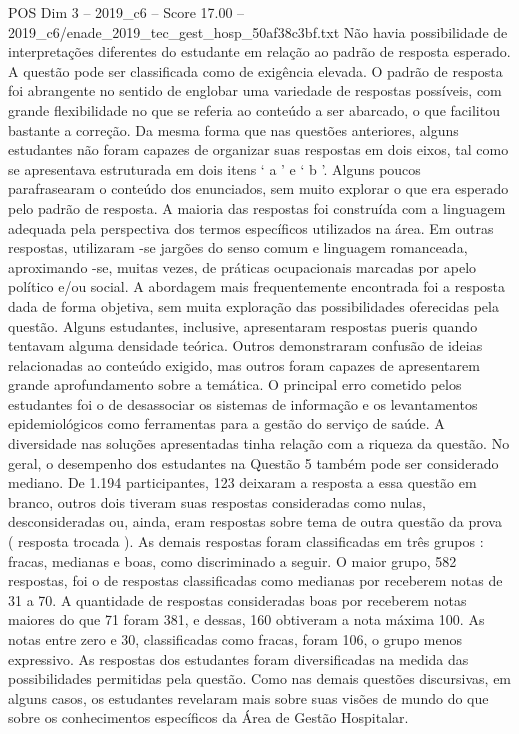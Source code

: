 \begin{textsample}{POS Dim 3 – 2019\_c6 – Score 17.00 – 2019\_c6/enade\_2019\_tec\_gest\_hosp\_50af38c3bf.txt}
Não havia possibilidade de interpretações diferentes do estudante em relação ao padrão de resposta esperado.
A questão pode ser classificada como de exigência elevada.
O padrão de resposta foi abrangente no sentido de englobar uma variedade de respostas possíveis, com grande flexibilidade no que se referia ao conteúdo a ser abarcado, o que facilitou bastante a correção.
Da mesma forma que nas questões anteriores, alguns estudantes não foram capazes de organizar suas respostas em dois eixos, tal como se apresentava estruturada em dois itens ‘ a ’ e ‘ b ’.
Alguns poucos parafrasearam o conteúdo dos enunciados, sem muito explorar o que era esperado pelo padrão de resposta.
A maioria das respostas foi construída com a linguagem adequada pela perspectiva dos termos específicos utilizados na área.
Em outras respostas, utilizaram -se jargões do senso comum e linguagem romanceada, aproximando -se, muitas vezes, de práticas ocupacionais marcadas por apelo político e/ou social.
A abordagem mais frequentemente encontrada foi a resposta dada de forma objetiva, sem muita exploração das possibilidades oferecidas pela questão.
Alguns estudantes, inclusive, apresentaram respostas pueris quando tentavam alguma densidade teórica.
Outros demonstraram confusão de ideias relacionadas ao conteúdo exigido, mas outros foram capazes de apresentarem grande aprofundamento sobre a temática.
O principal erro cometido pelos estudantes foi o de desassociar os sistemas de informação e os levantamentos epidemiológicos como ferramentas para a gestão do serviço de saúde.
A diversidade nas soluções apresentadas tinha relação com a riqueza da questão.
No geral, o desempenho dos estudantes na Questão 5 também pode ser considerado mediano.
De 1.194 participantes, 123 deixaram a resposta a essa questão em branco, outros dois tiveram suas respostas consideradas como nulas, desconsideradas ou, ainda, eram respostas sobre tema de outra questão da prova ( resposta trocada ).
As demais respostas foram classificadas em três grupos : fracas, medianas e boas, como discriminado a seguir.
O maior grupo, 582 respostas, foi o de respostas classificadas como medianas por receberem notas de 31 a 70.
A quantidade de respostas consideradas boas por receberem notas maiores do que 71 foram 381, e dessas, 160 obtiveram a nota máxima 100.
As notas entre zero e 30, classificadas como fracas, foram 106, o grupo menos expressivo.
As respostas dos estudantes foram diversificadas na medida das possibilidades permitidas pela questão.
Como nas demais questões discursivas, em alguns casos, os estudantes revelaram mais sobre suas visões de mundo do que sobre os conhecimentos específicos da Área de Gestão Hospitalar.

\end{textsample}
